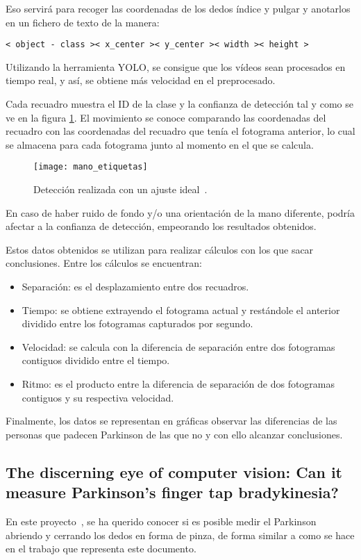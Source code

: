 Eso servirá para recoger las coordenadas de los dedos índice y pulgar y anotarlos en un fichero de texto de la manera:
\begin{center}
	\texttt{< object - class >< x\_center >< y\_center >< width >< height >}
\end{center}

Utilizando la herramienta YOLO, se consigue que los vídeos sean procesados en tiempo real, y así, se obtiene más velocidad en el preprocesado.

Cada recuadro muestra el ID de la clase y la confianza de detección tal y como se ve en la figura \ref{fig:manoetiquetas}. El movimiento se conoce comparando las coordenadas del recuadro con las coordenadas del recuadro que tenía el fotograma anterior, lo cual se almacena para cada fotograma junto al momento en el que se calcula.

\begin{figure}[]
	\texttt{[image: mano\_etiquetas]}
	\caption[Detección realizada con un ajuste ideal.]{Detección realizada con un ajuste ideal~\cite{jaber2021proposing}.}
	\label{fig:manoetiquetas}
\end{figure}

En caso de haber ruido de fondo y/o una orientación de la mano diferente, podría afectar a la confianza de detección, empeorando los resultados obtenidos.

Estos datos obtenidos se utilizan para realizar cálculos con los que sacar conclusiones. Entre los cálculos se encuentran:

\begin{itemize}
	\item Separación: es el desplazamiento entre dos recuadros.
	\item Tiempo: se obtiene extrayendo el fotograma actual y restándole el anterior dividido entre los fotogramas capturados por segundo.
	\item Velocidad: se calcula con la diferencia de separación entre dos fotogramas contiguos dividido entre el tiempo.
	\item Ritmo: es el producto entre la diferencia de separación de dos fotogramas contiguos y su respectiva velocidad.
\end{itemize}

Finalmente, los datos se representan en gráficas observar las diferencias de las personas que padecen Parkinson de las que no y con ello alcanzar conclusiones.

\subsection{The discerning eye of computer vision: Can it measure Parkinson's finger tap bradykinesia?}
En este proyecto~\cite{williams2020discerning}, se ha querido conocer si es posible medir el Parkinson abriendo y cerrando los dedos en forma de pinza, de forma similar a como se hace en el trabajo que representa este documento.

